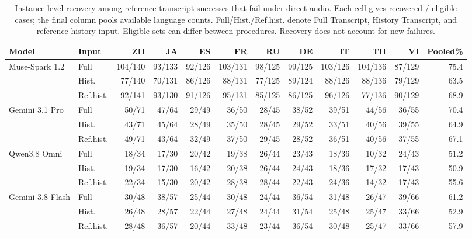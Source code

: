 \begin{table}[htbp]
\centering
\caption{Instance-level recovery among reference-transcript successes that fail under direct audio. Each cell gives recovered / eligible cases; the final column pools available language counts. Full/Hist./Ref.hist. denote Full Transcript, History Transcript, and reference-history input. Eligible sets can differ between procedures. Recovery does not account for new failures.}
\label{tab:recovery_counts}
\begingroup
\fontsize{7.8}{9.5}\selectfont
\setlength{\tabcolsep}{1pt}
\renewcommand{\arraystretch}{1.06}
\begin{tabular*}{\linewidth}{@{}l@{\hspace{5pt}}l@{\extracolsep{\fill}}*{9}{r}r@{}}
\toprule
\textbf{Model} & \textbf{Input} & \textbf{ZH} & \textbf{JA} & \textbf{ES} & \textbf{FR} & \textbf{RU} & \textbf{DE} & \textbf{IT} & \textbf{TH} & \textbf{VI} & \textbf{Pooled\%} \\
\midrule
Muse-Spark 1.2 & Full & 104/140 & 93/133 & 92/126 & 103/131 & 98/125 & 99/125 & 103/126 & 104/136 & 87/129 & 75.4 \\
 & Hist. & 77/140 & 70/131 & 86/126 & 88/131 & 77/125 & 89/124 & 88/126 & 88/136 & 79/129 & 63.5 \\
 & Ref.hist. & 92/141 & 93/130 & 91/126 & 95/131 & 85/125 & 86/125 & 96/126 & 77/136 & 90/129 & 68.9 \\
Gemini 3.1 Pro & Full & 50/71 & 47/64 & 29/49 & 36/50 & 28/45 & 38/52 & 39/51 & 44/56 & 36/55 & 70.4 \\
 & Hist. & 43/71 & 45/64 & 28/49 & 35/50 & 28/45 & 29/52 & 33/51 & 40/56 & 39/55 & 64.9 \\
 & Ref.hist. & 49/71 & 43/64 & 32/49 & 37/50 & 29/45 & 28/52 & 36/51 & 40/56 & 37/55 & 67.1 \\
Qwen3.8 Omni & Full & 18/34 & 17/30 & 20/42 & 19/38 & 26/44 & 23/43 & 18/36 & 10/32 & 24/43 & 51.2 \\
 & Hist. & 19/34 & 17/30 & 16/42 & 20/38 & 26/44 & 24/43 & 18/36 & 17/32 & 17/43 & 50.9 \\
 & Ref.hist. & 22/34 & 15/30 & 20/42 & 28/38 & 28/44 & 22/43 & 24/36 & 14/32 & 17/43 & 55.6 \\
Gemini 3.8 Flash & Full & 30/48 & 38/57 & 25/44 & 30/48 & 24/44 & 36/54 & 31/48 & 26/47 & 39/66 & 61.2 \\
 & Hist. & 26/48 & 28/57 & 22/44 & 27/48 & 24/44 & 31/54 & 25/48 & 25/47 & 33/66 & 52.9 \\
 & Ref.hist. & 28/48 & 36/57 & 20/44 & 33/48 & 23/44 & 36/54 & 30/48 & 25/47 & 33/66 & 57.9 \\

\end{tabular*}
\end{table}
